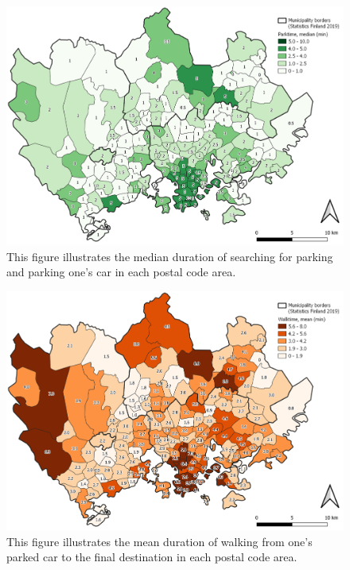 \begin{figure}[H]%
    \centering
    \includegraphics[width=.88\textwidth]{images/thesis_postalvis_parkmedian.png}
    \caption[Parktime, median, in the reseach area]{This figure illustrates the median duration of searching for parking and parking one's car in each postal code area.}%
    \label{fig:postalvis_parkmedian}%
\end{figure}

\begin{figure}[H]%
    \centering
    \includegraphics[width=.88\textwidth]{images/thesis_postalvis_walkmean.png}
    \caption[Walktime, mean, in the research area]{This figure illustrates the mean duration of walking from one's parked car to the final destination in each postal code area.}%
    \label{fig:postalvis_walkmean}%
\end{figure}


